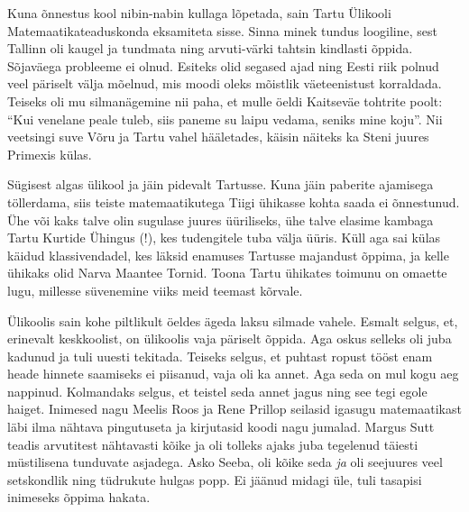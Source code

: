 Kuna õnnestus kool nibin-nabin kullaga lõpetada, sain Tartu Ülikooli Matemaatikateaduskonda eksamiteta sisse. Sinna minek tundus loogiline, sest Tallinn oli kaugel ja tundmata ning arvuti-värki tahtsin kindlasti õppida. Sõjaväega probleeme ei olnud. Esiteks olid segased ajad ning Eesti riik polnud veel päriselt välja mõelnud, mis moodi oleks mõistlik väeteenistust korraldada. Teiseks oli mu silmanägemine nii paha, et mulle öeldi Kaitseväe tohtrite poolt: \enquote{Kui venelane peale tuleb, siis paneme su laipu vedama, seniks mine koju}. Nii veetsingi suve Võru ja Tartu vahel hääletades, käisin näiteks ka Steni juures Primexis külas. 

Sügisest algas ülikool ja jäin pidevalt Tartusse. Kuna jäin paberite ajamisega töllerdama, siis teiste matemaatikutega Tiigi ühikasse kohta saada ei õnnestunud. Ühe või kaks talve olin sugulase juures üüriliseks, ühe talve elasime kambaga Tartu Kurtide Ühingus (!), kes tudengitele tuba välja üüris. Küll aga sai külas käidud klassivendadel, kes läksid enamuses Tartusse majandust õppima, ja kelle ühikaks olid Narva Maantee Tornid. Toona Tartu ühikates toimunu on omaette lugu, millesse süvenemine viiks meid teemast kõrvale.

Ülikoolis sain kohe piltlikult öeldes ägeda laksu silmade vahele. Esmalt selgus, et, erinevalt keskkoolist, on ülikoolis vaja päriselt õppida. Aga oskus selleks oli juba kadunud ja tuli uuesti tekitada. Teiseks selgus, et puhtast ropust tööst enam heade hinnete saamiseks ei piisanud, vaja oli ka annet. Aga seda on mul kogu aeg nappinud. Kolmandaks selgus, et teistel seda annet jagus ning see tegi egole haiget. Inimesed nagu Meelis Roos ja Rene Prillop seilasid igasugu matemaatikast läbi ilma nähtava pingutuseta ja kirjutasid koodi nagu jumalad. Margus Sutt teadis arvutitest nähtavasti kõike ja oli tolleks ajaks juba tegelenud täiesti müstilisena tunduvate asjadega. Asko Seeba, oli kõike seda \emph{ja} oli seejuures veel setskondlik ning tüdrukute hulgas popp. Ei jäänud midagi üle, tuli tasapisi inimeseks õppima hakata. 

